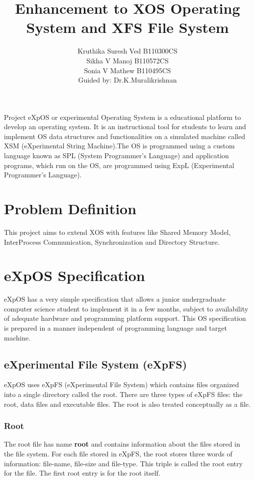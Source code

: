 \documentclass[11pt ,twosided]{article}
\title{Enhancement to XOS Operating System and XFS File System}
\author{ Kruthika Suresh Ved     B110300CS\\  Sikha V Manoj     B110572CS\\  Sonia V Mathew    B110495CS\\ Guided by: Dr.K.Muralikrishnan}
\begin{document}
\maketitle
	

\abstract{} 

Project eXpOS or experimental Operating System is a educational platform to develop an operating system. It is an instructional tool for students to learn and implement OS data structures and functionalities on a simulated machine called XSM (eXperimental String Machine).The OS is programmed using a custom language known as SPL (System Programmer's Language) and application programs, which run on the OS, are programmed using ExpL (Experimental Programmer's Language).


\section{Problem Definition}

This project aims to extend XOS with features like Shared Memory Model, Inter\-Process Communication, Synchronization and Directory Structure.
\section{eXpOS Specification}

eXpOS has a very simple specification that allows a junior undergraduate computer science student to implement it in a few months, subject to availability of adequate hardware and programming platform support. This OS specification is prepared in a manner independent of programming language and target machine.
\subsection{eXperimental File System (eXpFS)}

eXpOS uses eXpFS (eXperimental File System) which contains files organized into a single directory called the root. There are three types of eXpFS files: the root, data files and executable files. The root is also treated conceptually as a file.
\subsubsection{Root}

The root file has name \textbf {root} and contains information about the files stored in the file system. For each file stored in eXpFS, the root stores three words of information: file-name, file-size and file-type. This triple is called the root entry for the file. The first root entry is for the root itself.  
\end{document}
